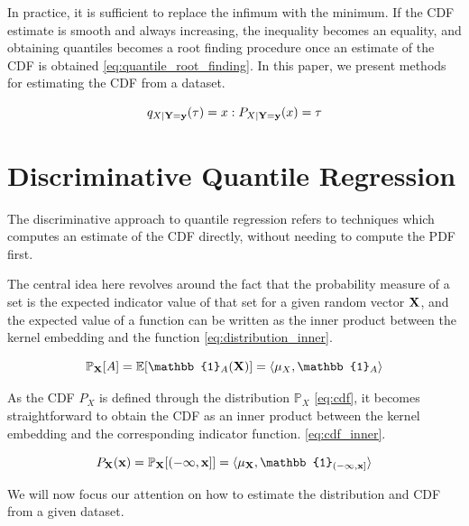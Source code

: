 \documentclass[twoside]{article} \usepackage{aistats2017}
\theoremstyle{definition}
\newcommand{\rv}[1]{{#1}}
\begin{document}
		In practice, it is sufficient to replace the infimum with the minimum. If the CDF estimate is smooth and always increasing, the inequality becomes an equality, and obtaining quantiles becomes a root finding procedure once an estimate of the CDF is obtained \eqref{eq:quantile_root_finding}. In this paper, we present methods for estimating the CDF from a dataset.
		
		\begin{equation}
			q_{\rv{X} | \bvec{\rv{Y}} = \bvec{y}}(\tau) = x : P_{\rv{X} | \bvec{\rv{Y}} = \bvec{y}}(x) = \tau
		\label{eq:quantile_root_finding}
		\end{equation}	
	
\section{Discriminative Quantile Regression}
\label{sec:discriminative_quantile_regression}

	The discriminative approach to quantile regression refers to techniques which computes an estimate of the CDF directly, without needing to compute the PDF first.
	
	The central idea here revolves around the fact that the probability measure of a set is the expected indicator value of that set for a given random vector $\bvec{\rv{X}}$, and the expected value of a function can be written as the inner product between the kernel embedding and the function \eqref{eq:distribution_inner}.
	
	\begin{equation}
		\mathbb{P}_{\bvec{\rv{X}}}[A] = \mathbb{E}[\mathbb{1}_{A}(\bvec{\rv{X}})] = \langle \mu_{\rv{X}}, \mathbb{1}_{A} \rangle
	\label{eq:distribution_inner}
	\end{equation}
	
	As the CDF $P_{\rv{X}}$ is defined through the distribution $\mathbb{P}_{\rv{X}}$ \eqref{eq:cdf}, it becomes straightforward to obtain the CDF as an inner product between the kernel embedding and the corresponding indicator function. \eqref{eq:cdf_inner}.
	
	\begin{equation}
		P_{\bvec{\rv{X}}}(\bvec{x}) = \mathbb{P}_{\bvec{\rv{X}}}[(-\bvec{\infty}, \bvec{x}]] = \langle \mu_{\bvec{\rv{X}}}, \mathbb{1}_{(-\bvec{\infty}, \bvec{x}]} \rangle
	\label{eq:cdf_inner}
	\end{equation}
	
	We will now focus our attention on how to estimate the distribution and CDF from a given dataset.
	
\end{document}
